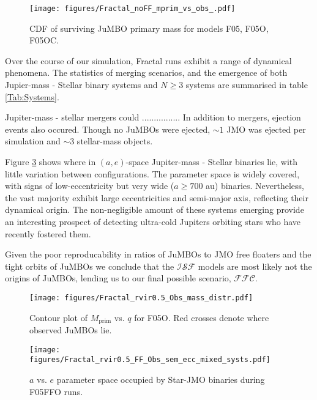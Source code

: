 \documentclass[aa]{aa}
\begin{document}
   \begin{figure}
    \centering
        \texttt{[image: figures/Fractal\_noFF\_mprim\_vs\_obs\_.pdf]}
        \caption{CDF of surviving JuMBO primary mass for models F05, F05O, F05OC.}
         \label{Fig:Fractal_mdistrCDF}
   \end{figure}

    Over the course of our simulation, Fractal runs exhibit a range of dynamical phenomena. The statistics of merging scenarios, and the emergence of both Jupier-mass - Stellar binary systems and $N\geq3$ systems are summarised in table \ref{Tab:Systems}.

    Jupiter-mass - stellar mergers could ................ In addition to mergers, ejection events also occured. Though no JuMBOs were ejected, $\sim1$ JMO was ejected per simulation and $\sim 3$ stellar-mass objects.
    
    Figure \ref{Fig:MixedSys_OrbParams} shows where in $(a,e)$-space Jupiter-mass - Stellar binaries lie, with little variation between configurations. The parameter space is widely covered, with signs of low-eccentricity but very wide ($a\geq700$ au) binaries. Nevertheless, the vast majority exhibit large eccentricities and semi-major axis, reflecting their dynamical origin. The non-negligible amount of these systems emerging provide an interesting prospect of detecting ultra-cold Jupiters orbiting stars who have recently fostered them.

    Given the poor reproducability in ratios of JuMBOs to JMO free floaters and the tight orbits of JuMBOs we conclude that the $\mathcal{ISF}$ models are most likely not the origins of JuMBOs, lending us to our final possible scenario, $\mathcal{FFC}$.

   \begin{figure}
    \centering
        \texttt{[image: figures/Fractal\_rvir0.5\_Obs\_mass\_distr.pdf]}
        \caption{Contour plot of $M_{\mathrm{prim}}$ vs. $q$ for F05O. Red crosses denote where observed JuMBOs lie.}
         \label{Fig:FractalObs_mdistr}
   \end{figure}
   
   \begin{figure}
    \centering
        \texttt{[image: figures/Fractal\_rvir0.5\_FF\_Obs\_sem\_ecc\_mixed\_systs.pdf]}
        \caption{$a$ vs. $e$ parameter space occupied by Star-JMO binaries during F05FFO runs.}
         \label{Fig:MixedSys_OrbParams}
   \end{figure}
\end{document}

